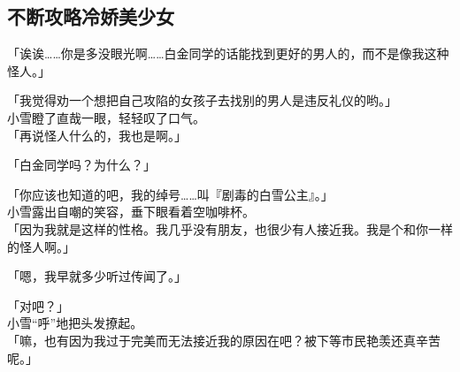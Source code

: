 \subsection{不断攻略冷娇美少女}

「诶诶……你是多没眼光啊……白金同学的话能找到更好的男人的，而不是像我这种怪人。」

「我觉得劝一个想把自己攻陷的女孩子去找别的男人是违反礼仪的哟。」\\

小雪瞪了直哉一眼，轻轻叹了口气。\\

「再说怪人什么的，我也是啊。」

「白金同学吗？为什么？」

「你应该也知道的吧，我的绰号……叫『剧毒的白雪公主』。」\\

小雪露出自嘲的笑容，垂下眼看着空咖啡杯。\\

「因为我就是这样的性格。我几乎没有朋友，也很少有人接近我。我是个和你一样的怪人啊。」

「嗯，我早就多少听过传闻了。」

「对吧？」\\

小雪“呼”地把头发撩起。\\

「嘛，也有因为我过于完美而无法接近我的原因在吧？被下等市民艳羡还真辛苦呢。」

